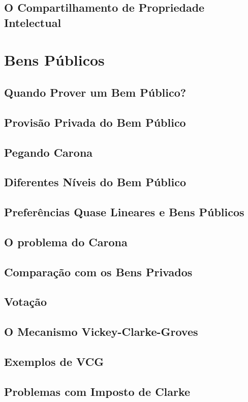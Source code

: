 \documentclass[a4paper,11pt,oneside]{book}
\theoremstyle{definition}
\theoremstyle{break}
\begin{document}
\section{O Compartilhamento de Propriedade Intelectual}

\chapter{Bens Públicos}

\section{Quando Prover um Bem Público?}
\section{Provisão Privada do Bem Público}
\section{Pegando Carona}
\section{Diferentes Níveis do Bem Público}
\section{Preferências Quase Lineares e Bens Públicos}
\section{O problema do Carona}
\section{Comparação com os Bens Privados}
\section{Votação}
\section{O Mecanismo Vickey-Clarke-Groves}
\section{Exemplos de VCG}
\section{Problemas com Imposto de Clarke}
\end{document}
